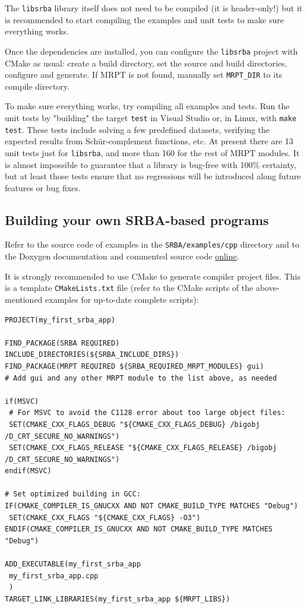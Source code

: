 \documentclass[a4paper,11pt]{article}
\begin{document}
The \texttt{libsrba} library itself does not need to be compiled (it is header-only!)
but it is recommended to start compiling the examples and unit tests to make sure everything works.

Once the dependencies are installed, you can configure the \texttt{libsrba} project
with CMake as usual: create a build directory, set the source and build directories, 
configure and generate. If MRPT is not found, manually set \texttt{MRPT\_DIR} to its compile directory.

To make sure everything works, try compiling all examples and tests. Run the unit tests by "building" the target \texttt{test} in Visual Studio or, in Linux, with \texttt{make test}.
These tests include solving a few predefined datasets, 
verifying the expected results from Sch\"ur-complement functions, etc. 
At present there are 13 unit tests just for \texttt{libsrba}, 
and more than 160 for the rest of MRPT modules.
It is almost impossible to guarantee that a library is bug-free with 100\% certainty, 
but at least those tests ensure that no regressions will be introduced along future features or bug fixes.

\subsection{Building your own SRBA-based programs}

Refer to the source code of examples in the \texttt{SRBA/examples/cpp} directory 
and to the Doxygen documentation and commented source code \href{http://mrpt.github.io/srba/}{online}.

It is strongly recommended to use CMake to generate compiler project files. 
This is a template \texttt{CMakeLists.txt} file (refer to the CMake scripts of the above-mentioned examples for up-to-date complete scripts):


\begin{lstlisting}[basicstyle=\scriptsize]
PROJECT(my_first_srba_app)

FIND_PACKAGE(SRBA REQUIRED)
INCLUDE_DIRECTORIES(${SRBA_INCLUDE_DIRS})
FIND_PACKAGE(MRPT REQUIRED ${SRBA_REQUIRED_MRPT_MODULES} gui)  
# Add gui and any other MRPT module to the list above, as needed

if(MSVC)
 # For MSVC to avoid the C1128 error about too large object files:
 SET(CMAKE_CXX_FLAGS_DEBUG "${CMAKE_CXX_FLAGS_DEBUG} /bigobj /D_CRT_SECURE_NO_WARNINGS")
 SET(CMAKE_CXX_FLAGS_RELEASE "${CMAKE_CXX_FLAGS_RELEASE} /bigobj /D_CRT_SECURE_NO_WARNINGS")
endif(MSVC)

# Set optimized building in GCC:
IF(CMAKE_COMPILER_IS_GNUCXX AND NOT CMAKE_BUILD_TYPE MATCHES "Debug")
 SET(CMAKE_CXX_FLAGS "${CMAKE_CXX_FLAGS} -O3")
ENDIF(CMAKE_COMPILER_IS_GNUCXX AND NOT CMAKE_BUILD_TYPE MATCHES "Debug")

ADD_EXECUTABLE(my_first_srba_app 
 my_first_srba_app.cpp
 )
TARGET_LINK_LIBRARIES(my_first_srba_app ${MRPT_LIBS})
\end{lstlisting}
\end{document}
